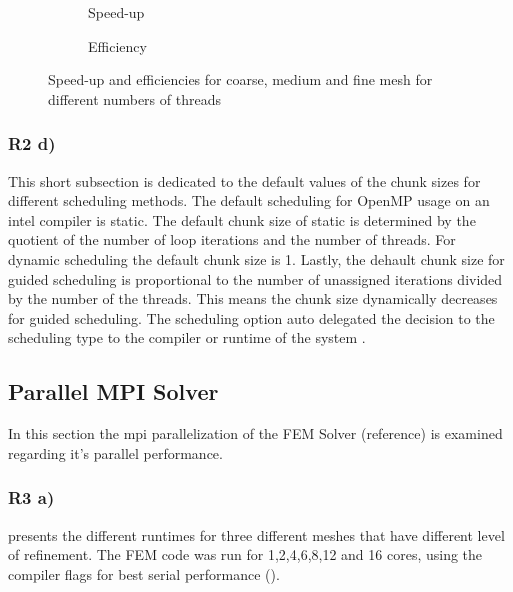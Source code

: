 \begin{figure}[h!]
	\centering
	\begin{subfigure}{0.49\textwidth}
		\centering
		\resizebox{0.5\width}{!}{}
		\caption{\label{fig::SPOpenMP} Speed-up}
	\end{subfigure}
	\hfill
	\begin{subfigure}{0.49\textwidth}
		\centering
		\resizebox{0.5\width}{!}{}
		\caption{\label{fig::EffOpenMP} Efficiency}
	\end{subfigure}
	\caption{\label{fig::EffSPOpenMP} Speed-up and efficiencies for coarse, medium and fine mesh for different numbers of threads}
\end{figure}

\subsubsection{R2 d)}
This short subsection is dedicated to the default values of the chunk sizes for different scheduling methods. The default scheduling for OpenMP usage on an intel compiler is static. The default chunk size of static is determined by the quotient of the number of loop iterations and the number of threads. For dynamic scheduling the default chunk size is 1. Lastly, the dehault chunk size for guided scheduling is proportional to the number of unassigned iterations divided by the number of the threads. This means the chunk size dynamically decreases for guided scheduling. The scheduling option auto delegated the decision to the scheduling type to the compiler or runtime of the system \cite{spehOpenMPScheduling2016}.

\clearpage
\subsection{Parallel MPI Solver}

In this section the mpi parallelization of the FEM Solver (reference) is examined regarding it's parallel performance. 

\subsubsection{R3 a)}

 presents the different runtimes for three different meshes that have different level of refinement. The FEM code was run for 1,2,4,6,8,12 and 16 cores, using the compiler flags for best serial performance (). 

